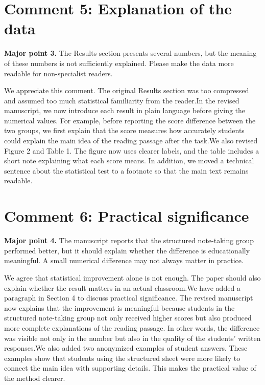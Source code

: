 \section*{Comment 5: Explanation of the data}
\begin{commentbox}
\textbf{Major point 3.} The Results section presents several numbers, but the meaning of these numbers is not sufficiently explained. Please make the data more readable for non-specialist readers.
\end{commentbox}
\begin{replybox}
We appreciate this comment. The original Results section was too compressed and assumed too much statistical familiarity from the reader.In the revised manuscript, we now introduce each result in plain language before giving the numerical values. For example, before reporting the score difference between the two groups, we first explain that the score measures how accurately students could explain the main idea of the reading passage after the task.We also revised Figure 2 and Table 1. The figure now uses clearer labels, and the table includes a short note explaining what each score means. In addition, we moved a technical sentence about the statistical test to a footnote so that the main text remains readable.
\end{replybox}
\section*{Comment 6: Practical significance}
\begin{commentbox}
\textbf{Major point 4.} The manuscript reports that the structured note-taking group performed better, but it should explain whether the difference is educationally meaningful. A small numerical difference may not always matter in practice.
\end{commentbox}
\begin{replybox}
We agree that statistical improvement alone is not enough. The paper should also explain whether the result matters in an actual classroom.We have added a paragraph in Section 4 to discuss practical significance. The revised manuscript now explains that the improvement is meaningful because students in the structured note-taking group not only received higher scores but also produced more complete explanations of the reading passage. In other words, the difference was visible not only in the number but also in the quality of the students' written responses.We also added two anonymized examples of student answers. These examples show that students using the structured sheet were more likely to connect the main idea with supporting details. This makes the practical value of the method clearer.
\end{replybox}
